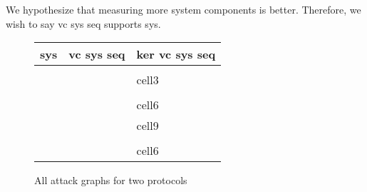 We hypothesize that measuring more system components is better. Therefore, we wish to say vc sys seq supports sys. 

\begin{figure}
    \begin{center}
        \begin{tabular}{ M{3.75cm} | M{4.75cm} | M{3.75cm} }
                sys & vc sys seq & ker vc sys seq \\
                \hline
                \hline
                \\  &  & cell3 \\ [50pt]
                \\  &  & cell6 \\ [50pt]  
                 &  & cell9 \\ [50pt]  
                \\  &  & cell6 \\ [50pt] 
            \end{tabular}
        \end{center}
        \caption{All attack graphs for two protocols}
    \end{figure}